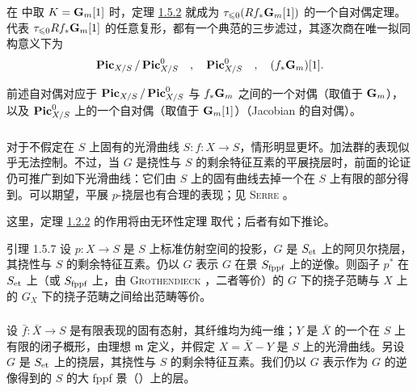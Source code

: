 \subsubsection{}
在  中取 $K=\mathbf{G}_{m}[1]$ 时，定理 \hyperref[XVIII.thm1.5.2]{1.5.2} 就成为 $\tau_{\leqslant 0}(Rf_{\ast}\mathbf{G}_{m}[1])$ 的一个自对偶定理。代表 $\tau_{\leqslant 0} Rf_{\ast} \mathbf{G}_{m}[1]$ 的任意复形，都有一个典范的三步滤过，其逐次商在唯一拟同构意义下为
$$
\operatorname{\mathbf{Pic}}_{X/S}/\operatorname{\mathbf{Pic}}^{0}_{X/S}\quad,\quad \operatorname{\mathbf{Pic}}^{0}_{X/S}\quad,\quad
(f_{\ast}\mathbf{G}_{m})[1]{}.
$$

前述自对偶对应于 $\operatorname{\mathbf{Pic}}_{X/S}/\operatorname{\mathbf{Pic}}^{0}_{X/S}$ 与 $f_{\ast}\mathbf{G}_{m}$ 之间的一个对偶（取值于 $\mathbf{G}_{m}$），以及 $\operatorname{\mathbf{Pic}}^{0}_{X/S}$ 上的一个自对偶（取值于 $\mathbf{G}_{m}[1]$）（Jacobian 的自对偶）。

\subsubsection{}
对于不假定在 $S$ 上固有的光滑曲线 $S:f:X\rightarrow S$，情形明显更坏。加法群的表现似乎无法控制。不过，当 $G$ 是挠性与 $S$ 的剩余特征互素的平展挠层时，前面的论证仍可推广到如下光滑曲线：它们由 $S$ 上的固有曲线去掉一个在 $S$ 上有限的部分得到。可以期望，平展 $p$-挠层也有合理的表现；见 \textsc{Serre} \cite[Ch.~VI nᵒ 11 p.~126]{sga4.exp.XVIII.bib.6}。

这里，定理 \hyperref[XVIII.thm1.2.2]{1.2.2} 的作用将由无环性定理\pageoriginale {} 取代；后者有如下推论。

\begin{enonce*}{引理 1.5.7}
设 $p:X\rightarrow S$ 是 $S$ 上标准仿射空间的投影，$G$ 是 $S_{\text{\rm et}}$ 上的阿贝尔挠层，其挠性与 $S$ 的剩余特征互素。仍以 $G$ 表示 $G$ 在景 $S_{\text{\rm fppf}}$ 上的逆像。则函子 $p^{\ast}$ 在 $S_{\text{\rm et}}$ 上（或 $S_{\text{\rm fppf}}$ 上，由 {\textsc{Grothendieck} \cite[Corollaire~11.9]{sga4.exp.XVIII.bib.2}}，二者等价）的 $G$ 下的挠子范畴与 $X$ 上的 $G_{X}$ 下的挠子范畴之间给出范畴等价。
\end{enonce*}

\setcounter{subsubsection}{7}
\subsubsection{}
设 $\bar{f}:\bar{X}\rightarrow S$ 是有限表现的固有态射，其纤维均为纯一维；$Y$ 是 $\bar{X}$ 的一个在 $S$ 上有限的闭子概形，由理想 $\mathfrak{m}$ 定义，并假定 $X=\bar{X}-Y$ 是 $S$ 上的光滑曲线。另设 $G$ 是 $S_{\text{\rm et}}$ 上的挠层，其挠性与 $S$ 的剩余特征互素。我们仍以 $G$ 表示作为 $G$ 的逆像得到的 $S$ 的大 fppf 景（）上的层。

